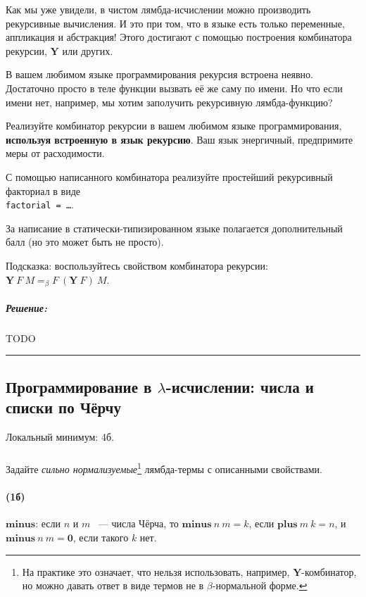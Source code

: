 \documentclass{article}
\newenvironment{proof}{\subparagraph{\hspace{-1em}Решение:\newline}}{\par\noindent\rule{\textwidth}{0.4pt}}
\newcommand{\comb}[1]{\mathbf{#1}}
\newcommand{\term}[1]{\mathbf{#1}}
\newcommand{\eqbeta}{=_\beta}
\renewcommand{\emph}[1]{{\color{blue} \textit{#1}}}
\begin{document}
    Как мы уже увидели, в чистом лямбда-исчислении можно производить рекурсивные вычисления.
    И это при том, что в языке есть только переменные, аппликация и абстракция!
    Этого достигают с помощью построения комбинатора рекурсии, $\comb{Y}$ или других.

    В вашем любимом языке программирования рекурсия встроена неявно.
    Достаточно просто в теле функции вызвать её же саму по имени.
    Но что если имени нет, например, мы хотим заполучить рекурсивную лямбда-функцию?

    Реализуйте комбинатор рекурсии в вашем любимом языке программирования, \textbf{используя встроенную в язык рекурсию}.
    Ваш язык энергичный, предпримите меры от расходимости.

    С помощью написанного комбинатора реализуйте простейший рекурсивный факториал в виде \\ \texttt{factorial = \ldots}.

    За написание в статически-типизированном языке полагается дополнительный балл (но это может быть не просто).

    Подсказка: воспользуйтесь свойством комбинатора рекурсии: $\comb{Y}~F~M \eqbeta F~(\comb{Y}~F)~M$.

    \begin{proof}
        TODO %
    \end{proof}

    \subsection{Программирование в $\lambda$-исчислении: числа и списки по Чёрчу}

    Локальный минимум: 4б.

    \subsubsection{}

    Задайте \emph{сильно нормализуемые}\footnote{На практике это означает, что нельзя использовать, например, $\comb{Y}$-комбинатор, но можно давать ответ в виде термов не в $\beta$-нормальной форме.} лямбда-термы с описанными свойствами.

    \paragraph{(1б)}

    $\term{minus}$: если $n$ и $m$ ~--- числа Чёрча, то $\term{minus}~n~m = k$,
    если $\term{plus}~m~k = n$, и $\term{minus}~n~m = \term{0}$, если такого $k$
    нет.
\end{document}
